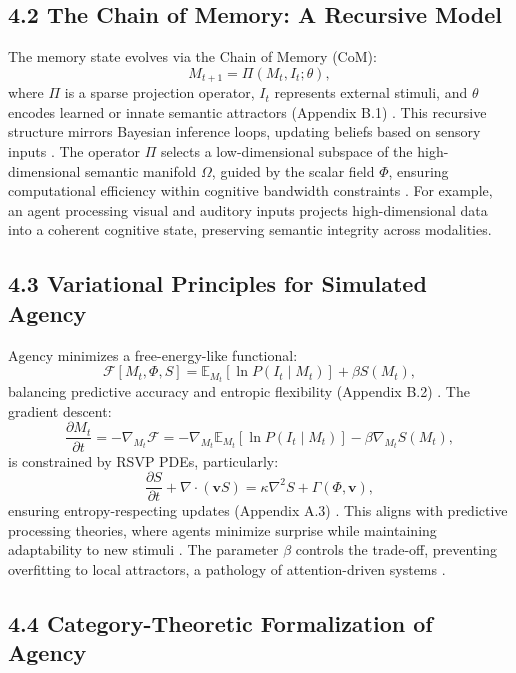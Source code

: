 \documentclass[12pt]{article}
\begin{document}
\subsection*{4.2 The Chain of Memory: A Recursive Model}

The memory state evolves via the Chain of Memory (CoM):
\[
M_{t+1} = \Pi(M_t, I_t; \theta),
\]
where \(\Pi\) is a sparse projection operator, \(I_t\) represents external stimuli, and \(\theta\) encodes learned or innate semantic attractors (Appendix B.1) \citep{pearl2009}. This recursive structure mirrors Bayesian inference loops, updating beliefs based on sensory inputs \citep{hohwy2013}. The operator \(\Pi\) selects a low-dimensional subspace of the high-dimensional semantic manifold \(\Omega\), guided by the scalar field \(\Phi\), ensuring computational efficiency within cognitive bandwidth constraints \citep{friston2010}. For example, an agent processing visual and auditory inputs projects high-dimensional data into a coherent cognitive state, preserving semantic integrity across modalities.

\subsection*{4.3 Variational Principles for Simulated Agency}

Agency minimizes a free-energy-like functional:
\[
\mathcal{F}[M_t, \Phi, S] = \mathbb{E}_{M_t}[\ln P(I_t \mid M_t)] + \beta S(M_t),
\]
balancing predictive accuracy and entropic flexibility (Appendix B.2) \citep{friston2010}. The gradient descent:
\[
\frac{\partial M_t}{\partial t} = -\nabla_{M_t} \mathcal{F} = -\nabla_{M_t} \mathbb{E}_{M_t}[\ln P(I_t \mid M_t)] - \beta \nabla_{M_t} S(M_t),
\]
is constrained by RSVP PDEs, particularly:
\[
\frac{\partial S}{\partial t} + \nabla \cdot (\mathbf{v} S) = \kappa \nabla^2 S + \Gamma(\Phi, \mathbf{v}),
\]
ensuring entropy-respecting updates (Appendix A.3) \citep{jaynes2003}. This aligns with predictive processing theories, where agents minimize surprise while maintaining adaptability to new stimuli \citep{hohwy2013}. The parameter \(\beta\) controls the trade-off, preventing overfitting to local attractors, a pathology of attention-driven systems \citep{lanier2018}.

\subsection*{4.4 Category-Theoretic Formalization of Agency}
\end{document}
